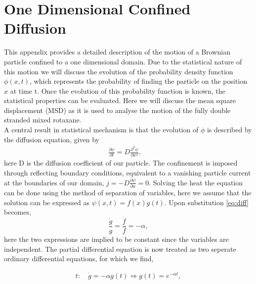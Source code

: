 \chapter{One Dimensional Confined Diffusion}

This appendix provides a detailed description of the motion of a Brownian particle
confined to a one dimensional domain. Due to the statistical nature of this motion we
will discuss the evolution of the probability density function $\phi(x,t)$, which
represents the probability of finding the particle on the position $x$ at time t.
Once the evolution of this probability function is known, the statistical properties can
be evaluated. Here we will discuss the mean square displacement (MSD) as it is used to
analyse the motion of the fully double stranded mixed rotaxane.\\
A central result in statistical mechanism is that the evolution of
$\phi$ is  described by the diffusion equation, given by
\begin{align}
  \frac{\partial \psi}{\partial t} =  D \frac{\partial^2 \psi}{\partial x^2}, \quad
  \label{eq:diff}
\end{align}
here D is the diffusion coefficient of our particle.
The confinement is imposed through reflecting boundary conditions, equivalent to a
vanishing particle current at the boundaries of our domain, $j = - D \frac{\partial
\psi}{\partial x} = 0$. Solving the heat the equation can be done using the method of
separation of variables, here we assume that the solution can be expressed as $ \psi(x,t)
= f(x)g(t)$. Upon substitution \ref{eq:diff} becomes,
\begin{equation}
  \frac{\dot{g}}{g} = \frac{\ddot{f}}{f} = - \alpha,
\end{equation}
here the two expressions are implied to be constant since the variables are independent.
The partial differential equation is now treated as two seperate ordinary differential
equations, for which we find,

\begin{align}
t:\quad \dot{g} = - \alpha g(t) \Rightarrow g(t) = e^{-\alpha t},
\end{align}

